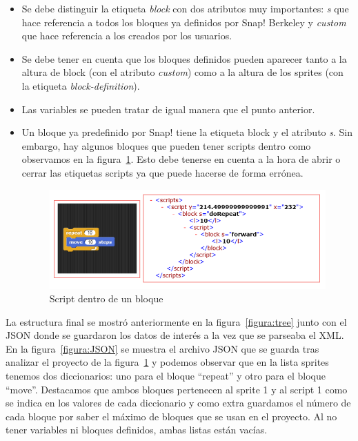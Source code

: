 \documentclass[a4paper, 12pt]{book}
\begin{document}
\begin{itemize}
    \item Se debe distinguir la etiqueta \textit{block} con dos atributos muy importantes: \textit{s} que hace referencia a todos los bloques ya definidos por Snap! Berkeley y \textit{custom} que hace referencia a los creados por los usuarios. 
    \item Se debe tener en cuenta que los bloques definidos pueden aparecer tanto a la altura de block (con el atributo \textit{custom}) como a la altura de los sprites (con la etiqueta \textit{block-definition}).
    \item Las variables se pueden tratar de igual manera que el punto anterior.
    \item Un bloque ya predefinido por Snap! tiene la etiqueta block y el atributo \textit{s}. Sin embargo, hay algunos bloques que pueden tener scripts dentro como observamos en la figura~\ref{figura:script-block}. Esto debe tenerse en cuenta a la hora de abrir o cerrar las etiquetas scripts ya que puede hacerse de forma errónea.
    \begin{figure}[h]
            \centering
            \includegraphics[scale=0.5]{img/block-script.PNG}
            \caption{Script dentro de un bloque}
            \label{figura:script-block}
        \end{figure}
\end{itemize}
La estructura final se mostró anteriormente en la figura~\ref{figura:tree} junto con el JSON donde se guardaron los datos de interés a la vez que se parseaba el XML. En la figura~\ref{figura:JSON} se muestra el archivo JSON que se guarda tras analizar el proyecto de la figura~\ref{figura:script-block} y podemos observar que en la lista sprites tenemos dos diccionarios: uno para el bloque ``repeat'' y otro para el bloque ``move''. Destacamos que ambos bloques pertenecen al sprite 1 y al script 1 como se indica en los valores de cada diccionario y como extra guardamos el número de cada bloque por saber el máximo de bloques que se usan en el proyecto. Al no tener variables ni bloques definidos, ambas listas están vacías.
\end{document}

